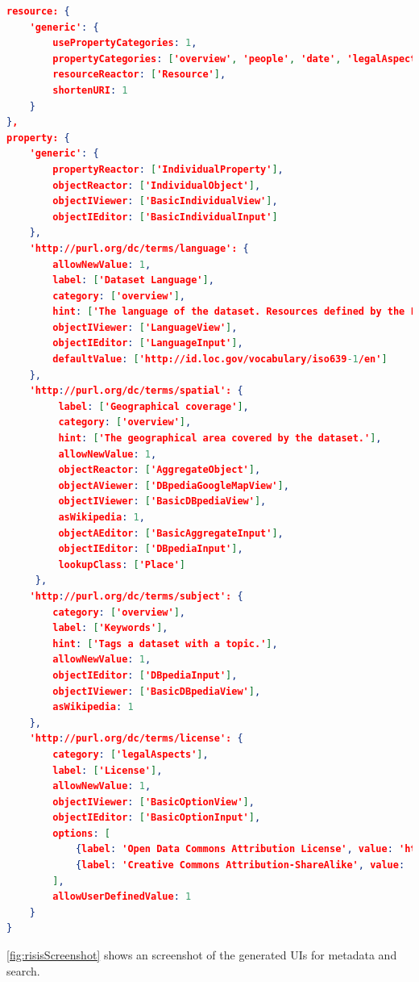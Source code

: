 \documentclass{acm_proc_article-sp}
\begin{document}
\begin{lstlisting}[language=json,firstnumber=1, label=code:config, caption=An excerpt of LD-R config for RISIS]
resource: {
    'generic': {
        usePropertyCategories: 1,
        propertyCategories: ['overview', 'people', 'date', 'legalAspects', 'technicalAspects', 'structuralAspects'],
        resourceReactor: ['Resource'],
        shortenURI: 1
    }
},
property: {
    'generic': {
        propertyReactor: ['IndividualProperty'],
        objectReactor: ['IndividualObject'],
        objectIViewer: ['BasicIndividualView'],
        objectIEditor: ['BasicIndividualInput']
    },
    'http://purl.org/dc/terms/language': {
        allowNewValue: 1,
        label: ['Dataset Language'],
        category: ['overview'],
        hint: ['The language of the dataset. Resources defined by the Library of Congress (http://id.loc.gov/vocabulary/iso639-1.html, http://id.loc.gov/vocabulary/iso639-2.html) SHOULD be used.'],
        objectIViewer: ['LanguageView'],
        objectIEditor: ['LanguageInput'],
        defaultValue: ['http://id.loc.gov/vocabulary/iso639-1/en']
    },
    'http://purl.org/dc/terms/spatial': {
         label: ['Geographical coverage'],
         category: ['overview'],
         hint: ['The geographical area covered by the dataset.'],
         allowNewValue: 1,
         objectReactor: ['AggregateObject'],
         objectAViewer: ['DBpediaGoogleMapView'],
         objectIViewer: ['BasicDBpediaView'],
         asWikipedia: 1,
         objectAEditor: ['BasicAggregateInput'],
         objectIEditor: ['DBpediaInput'],
         lookupClass: ['Place']
     },
    'http://purl.org/dc/terms/subject': {
        category: ['overview'],
        label: ['Keywords'],
        hint: ['Tags a dataset with a topic.'],
        allowNewValue: 1,
        objectIEditor: ['DBpediaInput'],
        objectIViewer: ['BasicDBpediaView'],
        asWikipedia: 1
    },
    'http://purl.org/dc/terms/license': {
        category: ['legalAspects'],
        label: ['License'],
        allowNewValue: 1,
        objectIViewer: ['BasicOptionView'],
        objectIEditor: ['BasicOptionInput'],
        options: [
            {label: 'Open Data Commons Attribution License', value: 'http://www.opendatacommons.org/licenses/by/'},
            {label: 'Creative Commons Attribution-ShareAlike', value: 'http://creativecommons.org/licenses/by-sa/3.0/'}
        ],
        allowUserDefinedValue: 1
    }   
}
\end{lstlisting}

\autoref{fig:risisScreenshot} shows an screenshot of the generated UIs for metadata and search.
\end{document}

